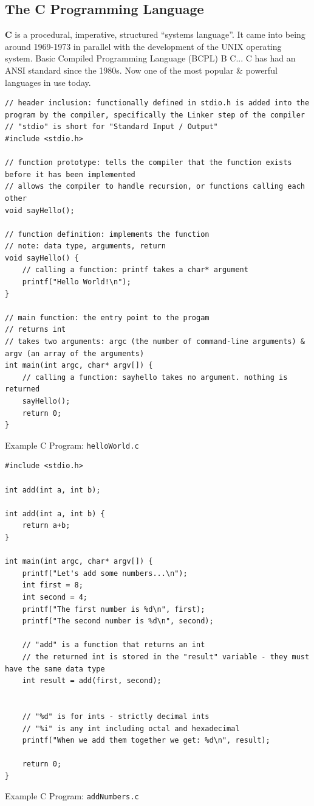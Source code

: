 \documentclass[a4paper,11pt]{article}
\newenvironment{code}{\captionsetup{type=listing}}{}
\begin{document}
\subsection{The C Programming Language}
\textbf{C} is a procedural, imperative, structured ``systems language''.
It came into being around 1969-1973 in parallel with the development of the UNIX operating system.
Basic Compiled Programming Language (BCPL) \rightarrow B \rightarrow C...
C has had an ANSI standard since the 1980s.
Now one of the most popular \& powerful languages in use today.
\begin{code}
\begin{verbatim}
// header inclusion: functionally defined in stdio.h is added into the program by the compiler, specifically the Linker step of the compiler
// "stdio" is short for "Standard Input / Output"
#include <stdio.h> 

// function prototype: tells the compiler that the function exists before it has been implemented
// allows the compiler to handle recursion, or functions calling each other
void sayHello(); 

// function definition: implements the function 
// note: data type, arguments, return
void sayHello() {
    // calling a function: printf takes a char* argument
    printf("Hello World!\n");
}

// main function: the entry point to the progam
// returns int
// takes two arguments: argc (the number of command-line arguments) & argv (an array of the arguments)
int main(int argc, char* argv[]) {
    // calling a function: sayhello takes no argument. nothing is returned
    sayHello();
    return 0;
}
\end{verbatim}
\caption{Example C Program: \texttt{helloWorld.c}}
\end{code}

\begin{code}
\begin{verbatim}
#include <stdio.h> 

int add(int a, int b); 

int add(int a, int b) {
    return a+b; 
}

int main(int argc, char* argv[]) {
    printf("Let's add some numbers...\n"); 
    int first = 8; 
    int second = 4; 
    printf("The first number is %d\n", first);
    printf("The second number is %d\n", second);

    // "add" is a function that returns an int
    // the returned int is stored in the "result" variable - they must have the same data type
    int result = add(first, second);


    // "%d" is for ints - strictly decimal ints 
    // "%i" is any int including octal and hexadecimal 
    printf("When we add them together we get: %d\n", result);

    return 0;
}

\end{verbatim}
\caption{Example C Program: \texttt{addNumbers.c}}
\end{code}
\end{document}
